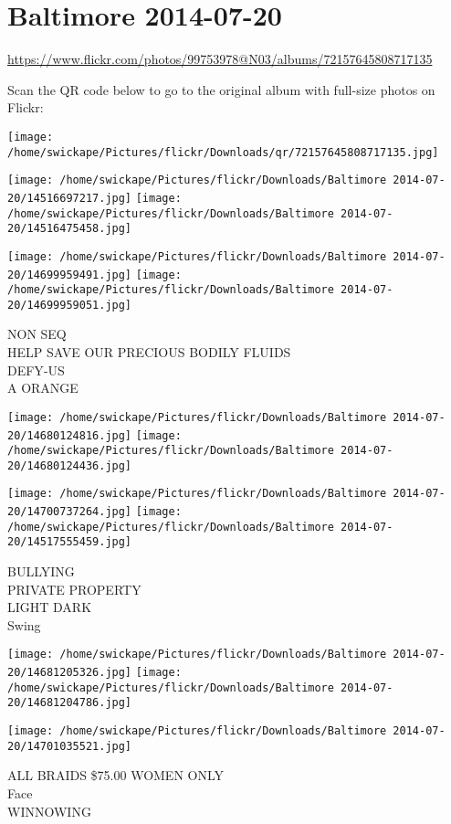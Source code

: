 \documentclass[10pt,letterpaper]{article}
\title{}
\author{}
\date{}
\begin{document}
\section*{Baltimore 2014-07-20}

\url{https://www.flickr.com/photos/99753978@N03/albums/72157645808717135}

Scan the QR code below to go to the original album with full-size photos on Flickr:

\texttt{[image: /home/swickape/Pictures/flickr/Downloads/qr/72157645808717135.jpg]}
\pagebreak

\texttt{[image: /home/swickape/Pictures/flickr/Downloads/Baltimore 2014-07-20/14516697217.jpg]}
\texttt{[image: /home/swickape/Pictures/flickr/Downloads/Baltimore 2014-07-20/14516475458.jpg]}

\texttt{[image: /home/swickape/Pictures/flickr/Downloads/Baltimore 2014-07-20/14699959491.jpg]}
\texttt{[image: /home/swickape/Pictures/flickr/Downloads/Baltimore 2014-07-20/14699959051.jpg]}

NON SEQ\\
HELP SAVE OUR PRECIOUS BODILY FLUIDS\\
DEFY{-}US\\
A ORANGE
\pagebreak

\texttt{[image: /home/swickape/Pictures/flickr/Downloads/Baltimore 2014-07-20/14680124816.jpg]}
\texttt{[image: /home/swickape/Pictures/flickr/Downloads/Baltimore 2014-07-20/14680124436.jpg]}

\texttt{[image: /home/swickape/Pictures/flickr/Downloads/Baltimore 2014-07-20/14700737264.jpg]}
\texttt{[image: /home/swickape/Pictures/flickr/Downloads/Baltimore 2014-07-20/14517555459.jpg]}

BULLYING\\
PRIVATE PROPERTY\\
LIGHT DARK\\
Swing
\pagebreak

\texttt{[image: /home/swickape/Pictures/flickr/Downloads/Baltimore 2014-07-20/14681205326.jpg]}
\texttt{[image: /home/swickape/Pictures/flickr/Downloads/Baltimore 2014-07-20/14681204786.jpg]}

\texttt{[image: /home/swickape/Pictures/flickr/Downloads/Baltimore 2014-07-20/14701035521.jpg]}

ALL BRAIDS \$75.00 WOMEN ONLY\\
Face\\
WINNOWING
\pagebreak
\end{document}
